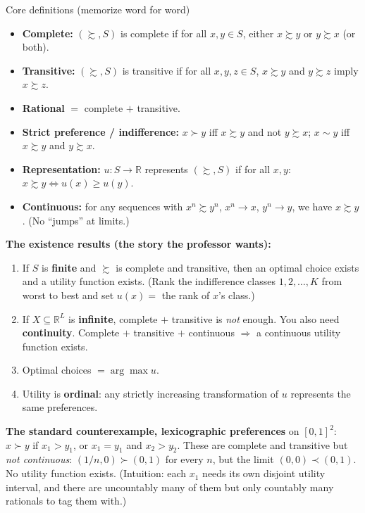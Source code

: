 \documentclass[11pt]{article}
\begin{document}
\begin{defbox}{Core definitions (memorize word for word)}
\begin{itemize}
\item \textbf{Complete:} $(\succsim,S)$ is complete if for all $x,y\in S$, either $x\succsim y$ or $y\succsim x$ (or both).
\item \textbf{Transitive:} $(\succsim,S)$ is transitive if for all $x,y,z\in S$, $x\succsim y$ and $y\succsim z$ imply $x\succsim z$.
\item \textbf{Rational} $=$ complete $+$ transitive.
\item \textbf{Strict preference / indifference:} $x\succ y$ iff $x\succsim y$ and not $y\succsim x$; $x\sim y$ iff $x\succsim y$ and $y\succsim x$.
\item \textbf{Representation:} $u:S\to\mathbb{R}$ represents $(\succsim,S)$ if for all $x,y$: $x\succsim y\iff u(x)\ge u(y)$.
\item \textbf{Continuous:} for any sequences with $x^n\succsim y^n$, $x^n\to x$, $y^n\to y$, we have $x\succsim y$. (No ``jumps'' at limits.)
\end{itemize}
\end{defbox}

\textbf{The existence results (the story the professor wants):}
\begin{enumerate}
\item If $S$ is \textbf{finite} and $\succsim$ is complete and transitive, then an optimal choice exists and a utility function exists. (Rank the indifference classes $1,2,\dots,K$ from worst to best and set $u(x)=$ the rank of $x$'s class.)
\item If $X\subseteq\mathbb{R}^L$ is \textbf{infinite}, complete $+$ transitive is \emph{not} enough. You also need \textbf{continuity}. Complete $+$ transitive $+$ continuous $\Rightarrow$ a continuous utility function exists.
\item Optimal choices $=\arg\max u$.
\item Utility is \textbf{ordinal}: any strictly increasing transformation of $u$ represents the same preferences.
\end{enumerate}

\textbf{The standard counterexample, lexicographic preferences} on $[0,1]^2$: $x\succ y$ if $x_1>y_1$, or $x_1=y_1$ and $x_2>y_2$. These are complete and transitive but \emph{not continuous}: $(1/n,0)\succ(0,1)$ for every $n$, but the limit $(0,0)\prec(0,1)$. No utility function exists. (Intuition: each $x_1$ needs its own disjoint utility interval, and there are uncountably many of them but only countably many rationals to tag them with.)
\end{document}
